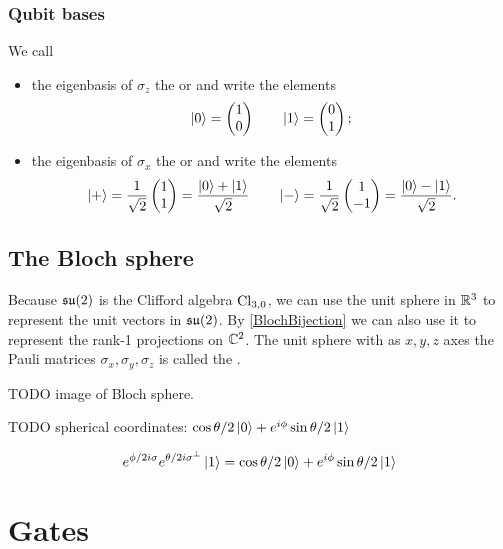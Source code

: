 \subsubsection{Qubit bases}
\begin{definition}
We call
\begin{itemize}
\item the eigenbasis of $\sigma_z$ the  or  and write the elements
\[ \left| 0 \right\rangle = \begin{pmatrix}
1 \\ 0
\end{pmatrix} \qquad \left| 1 \right\rangle = \begin{pmatrix}
0 \\ 1
\end{pmatrix}; \]
\item the eigenbasis of $\sigma_x$ the  or  and write the elements
\[ \left| + \right\rangle = \frac{1}{\sqrt{2}}\begin{pmatrix}
1 \\ 1
\end{pmatrix} = \frac{\left| 0 \right\rangle + \left| 1 \right\rangle}{\sqrt{2}} \qquad \left| - \right\rangle = \frac{1}{\sqrt{2}}\begin{pmatrix}
1 \\ -1
\end{pmatrix} = \frac{\left| 0 \right\rangle - \left| 1 \right\rangle}{\sqrt{2}}. \]
\end{itemize}
\end{definition}

\subsection{The Bloch sphere}
Because $\operatorname{\mathfrak{su}}(2)$ is the Clifford algebra $\operatorname{Cl}_{3,0}$, we can use the unit sphere in $\mathbb{R}^3$ to represent the unit vectors in $\operatorname{\mathfrak{su}}(2)$. By \ref{BlochBijection} we can also use it to represent the rank-1 projections on $\mathbb{C}^2$. The unit sphere with as $x,y,z$ axes the Pauli matrices $\sigma_x,\sigma_y, \sigma_z$ is called the .

TODO image of Bloch sphere.

TODO spherical coordinates: $\cos\theta / 2\left| 0 \right\rangle + e^{i\phi}\sin\theta/2 \left| 1 \right\rangle$
\begin{lemma}
\[ e^{\phi/2 i\sigma}e^{\theta/2 i\sigma^\perp}\left| 1 \right\rangle = \cos\theta / 2\left| 0 \right\rangle + e^{i\phi}\sin\theta/2 \left| 1 \right\rangle \]
\end{lemma}

\section{Gates}
